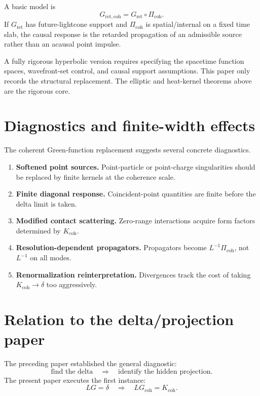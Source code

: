 \documentclass[11pt]{article}
\begin{document}
A basic model is
\[
G_{\mathrm{ret,coh}} = G_{\mathrm{ret}}\circ \Pi_{\mathrm{coh}}.
\]
If \(G_{\mathrm{ret}}\) has future-lightcone support and \(\Pi_{\mathrm{coh}}\) is spatial/internal on a fixed time slab, the causal response is the retarded propagation of an admissible source rather than an acausal point impulse.

\begin{remark}[Scope]
A fully rigorous hyperbolic version requires specifying the spacetime function spaces, wavefront-set control, and causal support assumptions. This paper only records the structural replacement. The elliptic and heat-kernel theorems above are the rigorous core.
\end{remark}

\section{Diagnostics and finite-width effects}

The coherent Green-function replacement suggests several concrete diagnostics.

\begin{enumerate}
\item \textbf{Softened point sources.} Point-particle or point-charge singularities should be replaced by finite kernels at the coherence scale.
\item \textbf{Finite diagonal response.} Coincident-point quantities are finite before the delta limit is taken.
\item \textbf{Modified contact scattering.} Zero-range interactions acquire form factors determined by \(K_{\mathrm{coh}}\).
\item \textbf{Resolution-dependent propagators.} Propagators become \(L^{-1}\Pi_{\mathrm{coh}}\), not \(L^{-1}\) on all modes.
\item \textbf{Renormalization reinterpretation.} Divergences track the cost of taking \(K_{\mathrm{coh}}\to\delta\) too aggressively.
\end{enumerate}

\section{Relation to the delta/projection paper}

The preceding paper established the general diagnostic:
\[
\text{find the delta} \quad\Rightarrow\quad \text{identify the hidden projection}.
\]
The present paper executes the first instance:
\[
LG=\delta
\quad\Rightarrow\quad
LG_{\mathrm{coh}}=K_{\mathrm{coh}}.
\]
\end{document}
